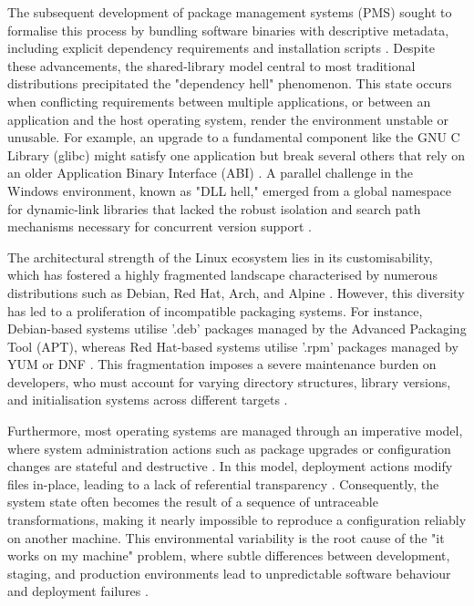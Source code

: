 \documentclass[journal,onecolumn]{IEEEtran}
\begin{document}
The subsequent development of package management systems (PMS) sought to formalise this process by bundling software binaries with descriptive metadata, including explicit dependency requirements and installation scripts \cite{Varun2019}. Despite these advancements, the shared-library model central to most traditional distributions precipitated the "dependency hell" phenomenon. This state occurs when conflicting requirements between multiple applications, or between an application and the host operating system, render the environment unstable or unusable. For example, an upgrade to a fundamental component like the GNU C Library (glibc) might satisfy one application but break several others that rely on an older Application Binary Interface (ABI) \cite{Varun2019}\cite{Dolstra2004Nix}. A parallel challenge in the Windows environment, known as "DLL hell," emerged from a global namespace for dynamic-link libraries that lacked the robust isolation and search path mechanisms necessary for concurrent version support \cite{Dolstra2004Nix}\cite{Schiele2011}\cite{Zam2025}.

The architectural strength of the Linux ecosystem lies in its customisability, which has fostered a highly fragmented landscape characterised by numerous distributions such as Debian, Red Hat, Arch, and Alpine \cite{Zam2025}. However, this diversity has led to a proliferation of incompatible packaging systems. For instance, Debian-based systems utilise '.deb' packages managed by the Advanced Packaging Tool (APT), whereas Red Hat-based systems utilise '.rpm' packages managed by YUM or DNF \cite{Varun2019}\cite{Zam2025}. This fragmentation imposes a severe maintenance burden on developers, who must account for varying directory structures, library versions, and initialisation systems across different targets \cite{Zam2025}.

Furthermore, most operating systems are managed through an imperative model, where system administration actions such as package upgrades or configuration changes are stateful and destructive \cite{Varun2019}. In this model, deployment actions modify files in-place, leading to a lack of referential transparency \cite{Varun2019}\cite{Singh2025}. Consequently, the system state often becomes the result of a sequence of untraceable transformations, making it nearly impossible to reproduce a configuration reliably on another machine. This environmental variability is the root cause of the "it works on my machine" problem, where subtle differences between development, staging, and production environments lead to unpredictable software behaviour and deployment failures \cite{Singh2025}\cite{Moric2025}.
\end{document}
